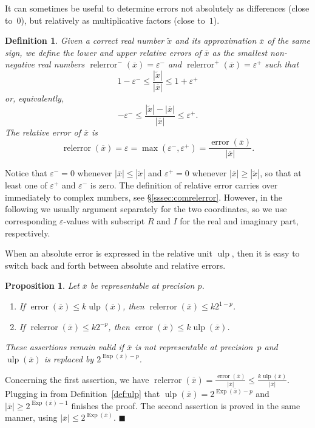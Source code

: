 \documentclass {article}
\newcommand {\corr}[1]{\widetilde {#1}}
\newcommand {\appro}[1]{\overline {#1}}
\newcommand {\Ulp}{{\operatorname {ulp}}}
\DeclareMathOperator{\Exp}{\operatorname {Exp}}
\newcommand{\error}{\operatorname {error}}
\newcommand{\relerror}{\operatorname {relerror}}
\renewcommand {\epsilon}{\varepsilon}
\renewcommand {\leq}{\leqslant}
\renewcommand {\geq}{\geqslant}
\newtheorem{definition}[theorem]{Definition}
\newtheorem{prop}[theorem]{Proposition}
\newenvironment{proof}{\noindent{\bf Proof:}}{{\hspace* {\fill}$\blacksquare$}}
\begin{document}
It can sometimes be useful to determine errors not absolutely as differences
(close to~$0$),
but relatively as multiplicative factors (close to~$1$).

\begin {definition}
\label {def:relerror}
Given a correct real number $\corr x$ and its approximation $\appro x$
of the same sign,
we define the {\em lower and upper relative errors} of $\appro x$
as the smallest non-negative real numbers
$\relerror^- (\appro x) = \epsilon^-$ and
$\relerror^+ (\appro x) = \epsilon^+$
such that
\[
1 - \epsilon^- \leq \frac {|\corr x|}{|\appro x|} \leq
1 + \epsilon^+
\]
or, equivalently,
\[
- \epsilon^- \leq \frac {|\corr x| - |\appro x|}{| \appro x| } \leq
\epsilon^+.
\]
The {\em relative error} of $\appro x$ is
\[
\relerror (\appro x) = \epsilon = \max (\epsilon^-, \epsilon^+)
= \frac {\error (\appro x)}{|\appro x|}.
\]
\end {definition}

Notice that $\epsilon^- = 0$ whenever $|\appro x| \leq |\corr x|$
and $\epsilon^+ = 0$ whenever $|\appro x| \geq |\corr x|$, so that
at least one of $\epsilon^+$ and $\epsilon^-$ is zero.
The definition of relative error carries over immediately to complex numbers,
see \S\ref {sssec:comrelerror}.
However, in the following we usually argument separately for the two coordinates,
so we use corresponding $\epsilon$-values with subscript $R$ and $I$ for the
real and imaginary part, respectively.

When an absolute error is expressed in the relative unit $\Ulp$, then
it is easy to switch back and forth between absolute and relative errors.

\begin {prop}
\label {prop:relerror}
Let $\appro x$ be representable at precision $p$.
\begin {enumerate}
\item
If $\error (\appro x) \leq k \Ulp (\appro x)$,
then $\relerror (\appro x) \leq k 2^{1 - p}$.
\item
If $\relerror (\appro x) \leq k 2^{-p}$,
then $\error (\appro x) \leq k \Ulp (\appro x)$.
\end {enumerate}
These assertions remain valid if $\appro x$ is not representable at
precision~$p$ and $\Ulp (\appro x)$ is replaced by $2^{\Exp (\appro x) - p}$.
\end {prop}

\begin {proof}
Concerning the first assertion, we have
$
\relerror (\appro x) = \frac {\error (\appro x)}{|\appro x|}
\leq
\frac {k \Ulp (\appro x)}{|\appro x|}.
$
Plugging in from Definition~\ref {def:ulp} that
$\Ulp (\appro x) = 2^{\Exp (\appro x) - p}$ and
$|\appro x| \geq 2^{\Exp (\appro x) - 1}$ finishes the proof.
The second assertion is proved in the same manner, using
$|\appro x| \leq 2^{\Exp (\appro x)}$.
\end {proof}
\end{document}
